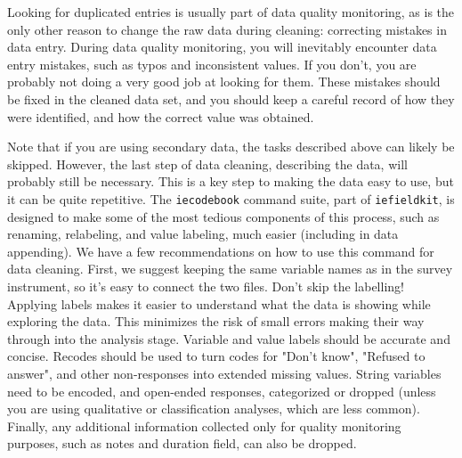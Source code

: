 Looking for duplicated entries is usually part of data quality monitoring,
as is the only other reason to change the raw data during cleaning:
correcting mistakes in data entry.
During data quality monitoring, you will inevitably encounter data entry mistakes,
such as typos and inconsistent values.
If you don't, you are probably not doing a very good job at looking for them.
These mistakes should be fixed in the cleaned data set,
and you should keep a careful record of how they were identified,
and how the correct value was obtained.

Note that if you are using secondary data, 
the tasks described above can likely be skipped.
However, the last step of data cleaning, describing the data,
will probably still be necessary.
This is a key step to making the data easy to use, but it can be quite repetitive.
The \texttt{iecodebook} command suite, part of \texttt{iefieldkit},
is designed to make some of the most tedious components of this process,
such as renaming, relabeling, and value labeling,
much easier (including in data appending).
We have a few recommendations on how to use this command for data cleaning.
First, we suggest keeping the same variable names as in the survey instrument,
so it's easy to connect the two files.
Don't skip the labelling!
Applying labels makes it easier to understand what the data is showing while exploring the data. 
This minimizes the risk of small errors making their way through into the analysis stage.
Variable and value labels should be accurate and concise.
Recodes should be used to turn codes for "Don't know", "Refused to answer", and
other non-responses into extended missing values.
String variables need to be encoded, and open-ended responses, categorized or dropped
(unless you are using qualitative or classification analyses, which are less common).
Finally, any additional information collected only for quality monitoring purposes,
such as notes and duration field, can also be dropped.


